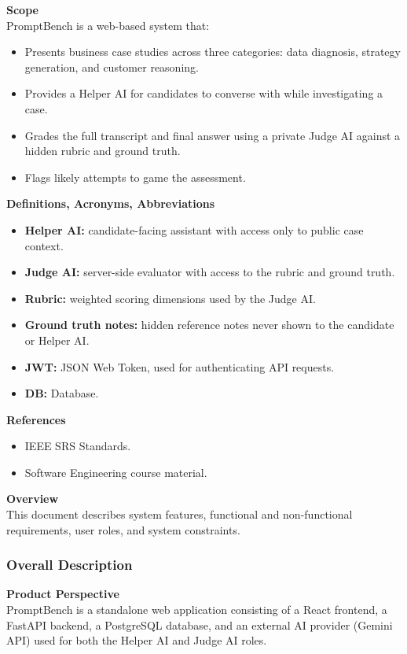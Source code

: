 \documentclass[11pt]{article}
\begin{document}
\textbf{Scope}\\
PromptBench is a web-based system that:
\begin{itemize}[nosep]
  \item Presents business case studies across three categories: data diagnosis, strategy generation, and customer reasoning.
  \item Provides a Helper AI for candidates to converse with while investigating a case.
  \item Grades the full transcript and final answer using a private Judge AI against a hidden rubric and ground truth.
  \item Flags likely attempts to game the assessment.
\end{itemize}

\textbf{Definitions, Acronyms, Abbreviations}
\begin{itemize}[nosep]
  \item \textbf{Helper AI:} candidate-facing assistant with access only to public case context.
  \item \textbf{Judge AI:} server-side evaluator with access to the rubric and ground truth.
  \item \textbf{Rubric:} weighted scoring dimensions used by the Judge AI.
  \item \textbf{Ground truth notes:} hidden reference notes never shown to the candidate or Helper AI.
  \item \textbf{JWT:} JSON Web Token, used for authenticating API requests.
  \item \textbf{DB:} Database.
\end{itemize}

\textbf{References}
\begin{itemize}[nosep]
  \item IEEE SRS Standards.
  \item Software Engineering course material.
\end{itemize}

\textbf{Overview}\\
This document describes system features, functional and non-functional requirements, user
roles, and system constraints.

\subsubsection{Overall Description}
\textbf{Product Perspective}\\
PromptBench is a standalone web application consisting of a React frontend, a FastAPI
backend, a PostgreSQL database, and an external AI provider (Gemini API) used for both the
Helper AI and Judge AI roles.
\end{document}
